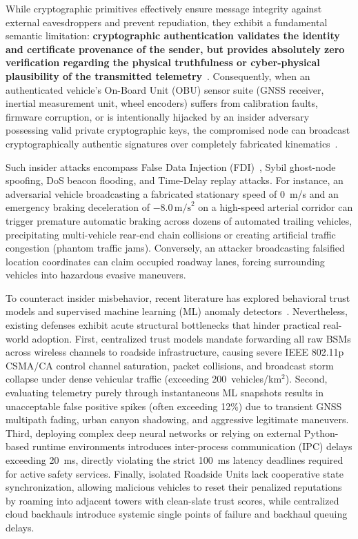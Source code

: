 \documentclass[conference]{IEEEtran}
\begin{document}
While cryptographic primitives effectively ensure message integrity against external eavesdroppers and prevent repudiation, they exhibit a fundamental semantic limitation: \textbf{cryptographic authentication validates the identity and certificate provenance of the sender, but provides absolutely zero verification regarding the physical truthfulness or cyber-physical plausibility of the transmitted telemetry}~\cite{whyte2013security, veremi}. Consequently, when an authenticated vehicle's On-Board Unit (OBU) sensor suite (GNSS receiver, inertial measurement unit, wheel encoders) suffers from calibration faults, firmware corruption, or is intentionally hijacked by an insider adversary possessing valid private cryptographic keys, the compromised node can broadcast cryptographically authentic signatures over completely fabricated kinematics~\cite{veremi}.

Such insider attacks encompass False Data Injection (FDI)~\cite{veremi}, Sybil ghost-node spoofing, DoS beacon flooding, and Time-Delay replay attacks. For instance, an adversarial vehicle broadcasting a fabricated stationary speed of 0~m/s and an emergency braking deceleration of $-8.0\,\text{m/s}^2$ on a high-speed arterial corridor can trigger premature automatic braking across dozens of automated trailing vehicles, precipitating multi-vehicle rear-end chain collisions or creating artificial traffic congestion (phantom traffic jams). Conversely, an attacker broadcasting falsified location coordinates can claim occupied roadway lanes, forcing surrounding vehicles into hazardous evasive maneuvers.

To counteract insider misbehavior, recent literature has explored behavioral trust models and supervised machine learning (ML) anomaly detectors~\cite{ahmad2019trust, so2018verifying, gyawali2020}. Nevertheless, existing defenses exhibit acute structural bottlenecks that hinder practical real-world adoption. First, centralized trust models mandate forwarding all raw BSMs across wireless channels to roadside infrastructure, causing severe IEEE 802.11p CSMA/CA control channel saturation, packet collisions, and broadcast storm collapse under dense vehicular traffic (exceeding 200~vehicles/km$^2$). Second, evaluating telemetry purely through instantaneous ML snapshots results in unacceptable false positive spikes (often exceeding 12\%) due to transient GNSS multipath fading, urban canyon shadowing, and aggressive legitimate maneuvers. Third, deploying complex deep neural networks or relying on external Python-based runtime environments introduces inter-process communication (IPC) delays exceeding 20~ms, directly violating the strict 100~ms latency deadlines required for active safety services. Finally, isolated Roadside Units lack cooperative state synchronization, allowing malicious vehicles to reset their penalized reputations by roaming into adjacent towers with clean-slate trust scores, while centralized cloud backhauls introduce systemic single points of failure and backhaul queuing delays.
\end{document}
